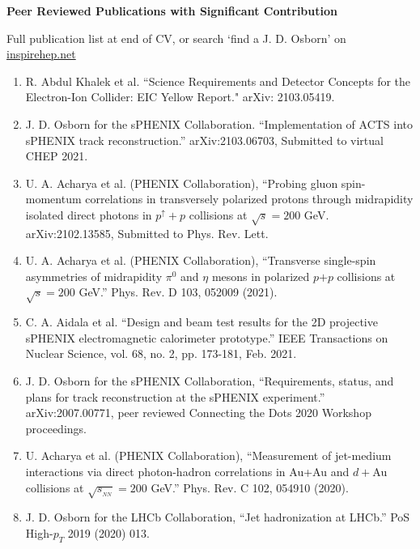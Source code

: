 \documentclass[11pt]{article}
\begin{document}
\begin{flushleft}
\Large\textbf{Peer Reviewed Publications with Significant Contribution}
\vspace{4pt}

\small 
Full publication list at end of CV, or search `find a J. D. Osborn' on \href{inspirehep.net}{inspirehep.net} 
\begin{center}
\normalsize
\begin{enumerate}
	\item R. Abdul Khalek et al. ``Science Requirements and Detector Concepts for the Electron-Ion Collider: EIC Yellow Report." arXiv: 2103.05419. 
	
	\item J. D. Osborn for the sPHENIX Collaboration. ``Implementation of ACTS into sPHENIX track reconstruction.'' arXiv:2103.06703, Submitted to virtual CHEP 2021.
	
	\item U. A. Acharya et al. (PHENIX Collaboration), ``Probing gluon spin-momentum correlations in transversely polarized protons through midrapidity isolated direct photons in $p^\uparrow+p$ collisions at $\sqrt{s}=200$ GeV. arXiv:2102.13585, Submitted to Phys. Rev. Lett.
	
	\item U. A. Acharya et al. (PHENIX Collaboration), ``Transverse single-spin asymmetries of midrapidity $\pi^0$ and $\eta$ mesons in polarized $p$$+$$p$ collisions at $\sqrt{s}=200$ GeV.'' Phys. Rev. D 103, 052009 (2021).
	
	\item C. A. Aidala et al. ``Design and beam test results for the 2D projective sPHENIX electromagnetic calorimeter prototype.'' IEEE Transactions on Nuclear Science, vol. 68, no. 2, pp. 173-181, Feb. 2021.
	
	\item J. D. Osborn for the sPHENIX Collaboration, ``Requirements, status, and plans for track reconstruction at the sPHENIX experiment.'' arXiv:2007.00771, peer reviewed Connecting the Dots 2020 Workshop proceedings.
	
	\item U. Acharya et al. (PHENIX Collaboration), ``Measurement of jet-medium interactions via direct photon-hadron correlations in Au+Au and $d+$Au collisions at $\sqrt{s_{_{NN}}}=200$ GeV.'' Phys. Rev. C 102, 054910 (2020).
	
	\item J. D. Osborn for the LHCb Collaboration, ``Jet hadronization at LHCb.'' PoS High-$p_T$ 2019 (2020) 013.
	

\end{enumerate}
\end{center}
\end{flushleft}
\end{document}
